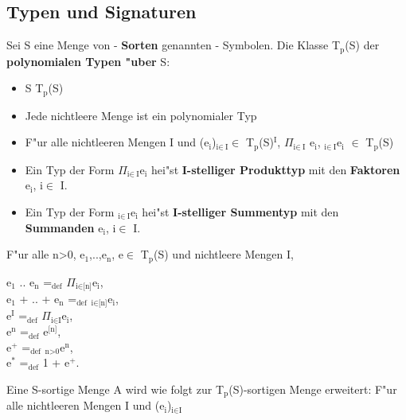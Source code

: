 \documentclass[11pt]{article}
\begin{document}
\subsection{Typen und Signaturen}
\label{sec-2-4}

Sei S eine Menge von - \textbf{Sorten} genannten - Symbolen.
Die Klasse T$_{\text{p}}$(S) der \textbf{polynomialen Typen "uber} S:
\begin{itemize}
\item S \subseteq T$_{\text{p}}$(S)
\item Jede nichtleere Menge ist ein polynomialer Typ
\item F"ur alle nichtleeren Mengen I und (e$_{\text{i}}$)$_{\text{i}\in\ \text{I}}$$\in$ T$_{\text{p}}$(S)$^{\text{I}}$, $\Pi$$_{\text{i}\in\ \text{I}}$ e$_{\text{i}}$, \amalg$_{\text{i}\in\ \text{I}}$e$_{\text{i}}$ $\in$ T$_{\text{p}}$(S)
\end{itemize}


\begin{itemize}
\item Ein Typ der Form $\Pi$$_{\text{i}\in\ \text{I}}$e$_{\text{i}}$ hei"st \textbf{I-stelliger Produkttyp} mit den \textbf{Faktoren} e$_{\text{i}}$, i$\in$ I.
\item Ein Typ der Form \amalg$_{\text{i}\in\ \text{I}}$e$_{\text{i}}$ hei"st \textbf{I-stelliger Summentyp} mit den \textbf{Summanden} e$_{\text{i}}$, i$\in$ I.
\end{itemize}

F"ur alle n>0, e$_{\text{1}}$,..,e$_{\text{n}}$, e$\in$ T$_{\text{p}}$(S) und nichtleere Mengen I,
\begin{center}
e$_{\text{1}}$ \texttimes{} .. \texttimes{} e$_{\text{n}}$ =$_{\text{def}}$ $\Pi$$_{\text{i} \in \text{[n]}}$e$_{\text{i}}$, \\
e$_{\text{1}}$ + .. + e$_{\text{n}}$ =$_{\text{def}}$ \amalg$_{\text{i} \in \text{[n]}}$e$_{\text{i}}$, \\
e$^{\text{I}}$ =$_{\text{def}}$ $\Pi$$_{\text{i} \in \text{I}}$e$_{\text{i}}$, \\
e$^{\text{n}}$ =$_{\text{def}}$ e$^{\text{[n]}}$, \\
e$^{\text{+}}$ =$_{\text{def}}$ \amalg$_{\text{n>0}}$e$^{\text{n}}$, \\
e$^{\text{*}}$ =$_{\text{def}}$ 1 + e$^{\text{+}}$. \\
\end{center}

Eine S-sortige Menge A wird wie folgt zur T$_{\text{p}}$(S)-sortigen Menge erweitert: F"ur alle nichtleeren Mengen I und (e$_{\text{i}}$)$_{\text{i} \in \text{I}}$
\end{document}
